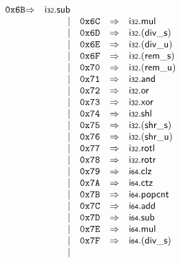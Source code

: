 $$\begin{array}{@{}l@{}rrlll@{}l@{}}
\mathtt{0x6B} &\Rightarrow& \mathsf{i{\scriptstyle32}} . \mathsf{sub} \\ &&|&
\mathtt{0x6C} &\Rightarrow& \mathsf{i{\scriptstyle32}} . \mathsf{mul} \\ &&|&
\mathtt{0x6D} &\Rightarrow& \mathsf{i{\scriptstyle32}} . ({\mathsf{div\_}}{\mathsf{s}}) \\ &&|&
\mathtt{0x6E} &\Rightarrow& \mathsf{i{\scriptstyle32}} . ({\mathsf{div\_}}{\mathsf{u}}) \\ &&|&
\mathtt{0x6F} &\Rightarrow& \mathsf{i{\scriptstyle32}} . ({\mathsf{rem\_}}{\mathsf{s}}) \\ &&|&
\mathtt{0x70} &\Rightarrow& \mathsf{i{\scriptstyle32}} . ({\mathsf{rem\_}}{\mathsf{u}}) \\ &&|&
\mathtt{0x71} &\Rightarrow& \mathsf{i{\scriptstyle32}} . \mathsf{and} \\ &&|&
\mathtt{0x72} &\Rightarrow& \mathsf{i{\scriptstyle32}} . \mathsf{or} \\ &&|&
\mathtt{0x73} &\Rightarrow& \mathsf{i{\scriptstyle32}} . \mathsf{xor} \\ &&|&
\mathtt{0x74} &\Rightarrow& \mathsf{i{\scriptstyle32}} . \mathsf{shl} \\ &&|&
\mathtt{0x75} &\Rightarrow& \mathsf{i{\scriptstyle32}} . ({\mathsf{shr\_}}{\mathsf{s}}) \\ &&|&
\mathtt{0x76} &\Rightarrow& \mathsf{i{\scriptstyle32}} . ({\mathsf{shr\_}}{\mathsf{u}}) \\ &&|&
\mathtt{0x77} &\Rightarrow& \mathsf{i{\scriptstyle32}} . \mathsf{rotl} \\ &&|&
\mathtt{0x78} &\Rightarrow& \mathsf{i{\scriptstyle32}} . \mathsf{rotr} \\ &&|&
\mathtt{0x79} &\Rightarrow& \mathsf{i{\scriptstyle64}} . \mathsf{clz} \\ &&|&
\mathtt{0x7A} &\Rightarrow& \mathsf{i{\scriptstyle64}} . \mathsf{ctz} \\ &&|&
\mathtt{0x7B} &\Rightarrow& \mathsf{i{\scriptstyle64}} . \mathsf{popcnt} \\ &&|&
\mathtt{0x7C} &\Rightarrow& \mathsf{i{\scriptstyle64}} . \mathsf{add} \\ &&|&
\mathtt{0x7D} &\Rightarrow& \mathsf{i{\scriptstyle64}} . \mathsf{sub} \\ &&|&
\mathtt{0x7E} &\Rightarrow& \mathsf{i{\scriptstyle64}} . \mathsf{mul} \\ &&|&
\mathtt{0x7F} &\Rightarrow& \mathsf{i{\scriptstyle64}} . ({\mathsf{div\_}}{\mathsf{s}}) \\ &&|&

\end{array}$$

